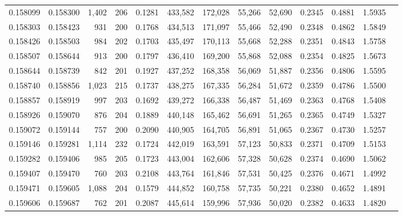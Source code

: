 \begin{tabular}{rrrrrrrrrrrrr}
0.158099 & 0.158300 & 1,402 & 206 &                                     0.1281 & 433,582 & 172,028 &  55,266 &  52,690 & 0.2345 & 0.4881 & 1.5935 \\
0.158303 & 0.158423 &   931 & 200 &                                     0.1768 & 434,513 & 171,097 &  55,466 &  52,490 & 0.2348 & 0.4862 & 1.5849 \\
0.158426 & 0.158503 &   984 & 202 &                                     0.1703 & 435,497 & 170,113 &  55,668 &  52,288 & 0.2351 & 0.4843 & 1.5758 \\
0.158507 & 0.158644 &   913 & 200 &                                     0.1797 & 436,410 & 169,200 &  55,868 &  52,088 & 0.2354 & 0.4825 & 1.5673 \\
0.158644 & 0.158739 &   842 & 201 &                                     0.1927 & 437,252 & 168,358 &  56,069 &  51,887 & 0.2356 & 0.4806 & 1.5595 \\
0.158740 & 0.158856 & 1,023 & 215 &                                     0.1737 & 438,275 & 167,335 &  56,284 &  51,672 & 0.2359 & 0.4786 & 1.5500 \\
0.158857 & 0.158919 &   997 & 203 &                                     0.1692 & 439,272 & 166,338 &  56,487 &  51,469 & 0.2363 & 0.4768 & 1.5408 \\
0.158926 & 0.159070 &   876 & 204 &                                     0.1889 & 440,148 & 165,462 &  56,691 &  51,265 & 0.2365 & 0.4749 & 1.5327 \\
0.159072 & 0.159144 &   757 & 200 &                                     0.2090 & 440,905 & 164,705 &  56,891 &  51,065 & 0.2367 & 0.4730 & 1.5257 \\
0.159146 & 0.159281 & 1,114 & 232 &                                     0.1724 & 442,019 & 163,591 &  57,123 &  50,833 & 0.2371 & 0.4709 & 1.5153 \\
0.159282 & 0.159406 &   985 & 205 &                                     0.1723 & 443,004 & 162,606 &  57,328 &  50,628 & 0.2374 & 0.4690 & 1.5062 \\
0.159407 & 0.159470 &   760 & 203 &                                     0.2108 & 443,764 & 161,846 &  57,531 &  50,425 & 0.2376 & 0.4671 & 1.4992 \\
0.159471 & 0.159605 & 1,088 & 204 &                                     0.1579 & 444,852 & 160,758 &  57,735 &  50,221 & 0.2380 & 0.4652 & 1.4891 \\
0.159606 & 0.159687 &   762 & 201 &                                     0.2087 & 445,614 & 159,996 &  57,936 &  50,020 & 0.2382 & 0.4633 & 1.4820 \\

\end{tabular}
